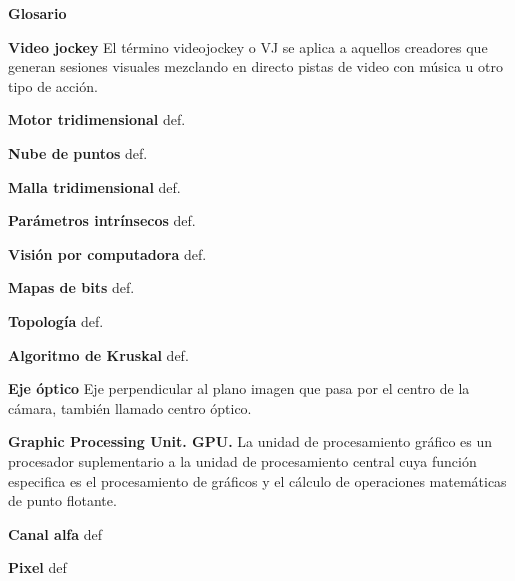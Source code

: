 ﻿\Huge
\textbf{Glosario}

\vspace{10 mm}

\normalsize 
\textbf{Video jockey}
 El término videojockey o VJ se aplica a aquellos creadores que generan sesiones visuales mezclando en directo pistas de video con música u otro tipo de acción.

\textbf{Motor tridimensional}
 def.
 
\textbf{Nube de puntos}
 def.

\textbf{Malla tridimensional}
def.

\textbf{Parámetros intrínsecos}
def.

\textbf{Visión por computadora}
def.
 
\textbf{Mapas de bits}
def.

\textbf{Topología}
 def.
 
\textbf{Algoritmo de Kruskal}
 def.  
 
\textbf{Eje óptico} 
 Eje perpendicular al plano imagen que pasa por el centro de la cámara, también llamado centro óptico.
 
\textbf{Graphic Processing Unit. GPU.}
 La unidad de procesamiento gráfico es un procesador suplementario a la unidad de procesamiento central cuya función especifica es el procesamiento de gráficos y el cálculo de operaciones matemáticas de punto flotante.
 
\textbf{Canal alfa}
 def 
 
\textbf{Pixel}
def
 
 

 


 


 


 


